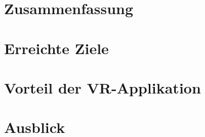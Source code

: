 
\section{Zusammenfassung}

\section{Erreichte Ziele}

\section{Vorteil der VR-Applikation}

\section{Ausblick}